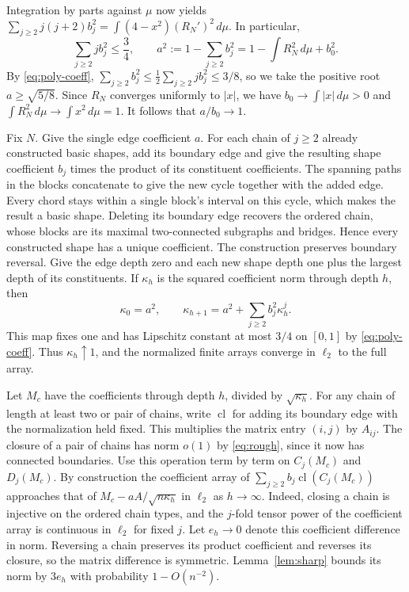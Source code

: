 \documentclass[11pt,letterpaper]{article}
\newcommand{\abs}[1]{\lvert #1\rvert}
\begin{document}
Integration by parts against \(\mu\) now yields
\(\sum_{j\ge2}j(j+2)b_j^2=\int(4-x^2)(R_N')^2\,d\mu\). In particular,
\begin{equation}\label{eq:poly-coeff}
 \sum_{j\ge2}j b_j^2\le\frac34,
 \qquad a^2:=1-\sum_{j\ge2}b_j^2=1-\int R_N^2\,d\mu+b_0^2.
\end{equation}
By \eqref{eq:poly-coeff},
\(\sum_{j\ge2}b_j^2\le\tfrac12\sum_{j\ge2}j b_j^2\le3/8\), so we take
the positive root \(a\ge\sqrt{5/8}\). Since \(R_N\) converges uniformly
to \(\abs x\), we have \(b_0\to\int\abs x\,d\mu>0\) and
\(\int R_N^2\,d\mu\to\int x^2\,d\mu=1\). It follows that \(a/b_0\to1\).

Fix \(N\). Give the single edge coefficient \(a\). For each chain of
\(j\ge2\) already constructed basic shapes, add its boundary edge
and give the resulting shape coefficient \(b_j\) times the product
of its constituent coefficients. The spanning paths in the blocks
concatenate to give the new cycle together with the added edge.
Every chord stays within a single block's interval on this cycle,
which makes the result a basic shape. Deleting its boundary edge
recovers the ordered chain, whose blocks are its
maximal two-connected subgraphs and bridges. Hence every constructed
shape has a unique coefficient. The construction preserves boundary
reversal. Give the edge depth zero and each new shape depth one plus
the largest depth of its constituents. If \(\kappa_h\) is the squared
coefficient norm through depth \(h\), then
\[
 \kappa_0=a^2,\qquad \kappa_{h+1}=a^2+\sum_{j\ge2} b_j^2 \kappa_h^j.
\]
This map fixes one and has Lipschitz constant at most \(3/4\) on
\([0,1]\) by \eqref{eq:poly-coeff}. Thus \(\kappa_h\uparrow1\), and the
normalized finite arrays converge in \(\ell_2\) to the full array.

Let \(M_c\) have the coefficients through depth \(h\), divided by
\(\sqrt{\kappa_h}\). For any chain of length at least two or pair of
chains, write \(\operatorname{cl}\) for adding its boundary edge with
the normalization held fixed. This multiplies the matrix entry
\((i,j)\) by \(A_{ij}\). The closure of a pair of chains has norm
\(o(1)\) by \eqref{eq:rough}, since it now has connected boundaries.
Use this operation term by term on \(C_j(M_c)\) and \(D_j(M_c)\). By
construction the coefficient array of \(\sum_{j\ge2}b_j
\operatorname{cl}(C_j(M_c))\) approaches that of
\(M_c-a A/\sqrt{n\kappa_h}\) in \(\ell_2\) as \(h\to\infty\). Indeed,
closing a chain is injective on the ordered chain types, and the
\(j\)-fold tensor power of the coefficient array is continuous in
\(\ell_2\) for fixed \(j\). Let \(e_h\to0\) denote this coefficient
difference in norm. Reversing a chain preserves its product
coefficient and reverses its closure, so the matrix difference is
symmetric. Lemma~\ref{lem:sharp} bounds its norm by \(3e_h\) with
probability \(1-O(n^{-2})\).
\end{document}
